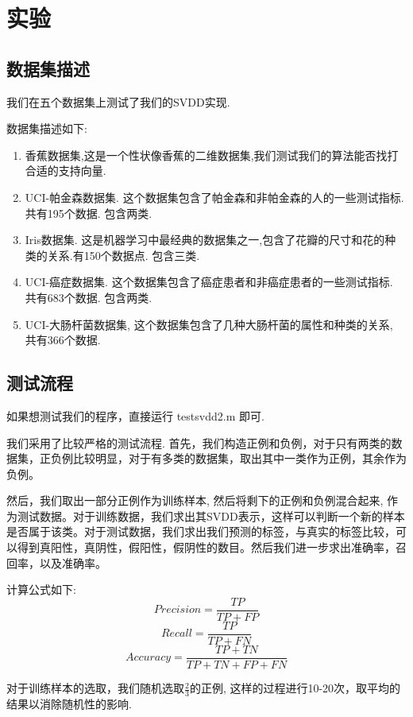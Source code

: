 \documentclass[article,12pt]{article}
\begin{document}
\section{实验}
\subsection{数据集描述}
我们在五个数据集上测试了我们的SVDD实现. 

数据集描述如下:

\begin{enumerate}
\item 香蕉数据集,这是一个性状像香蕉的二维数据集,我们测试我们的算法能否找打合适的支持向量.

\item UCI-帕金森数据集. 这个数据集包含了帕金森和非帕金森的人的一些测试指标. 共有195个数据. 包含两类. 

\item Iris数据集. 这是机器学习中最经典的数据集之一,包含了花瓣的尺寸和花的种类的关系.有150个数据点. 包含三类. 

\item UCI-癌症数据集. 这个数据集包含了癌症患者和非癌症患者的一些测试指标. 共有683个数据. 包含两类. 

\item UCI-大肠杆菌数据集, 这个数据集包含了几种大肠杆菌的属性和种类的关系, 共有366个数据. 


\end{enumerate}

\subsection{测试流程}

如果想测试我们的程序，直接运行 testsvdd2.m 即可.

我们采用了比较严格的测试流程. 首先，我们构造正例和负例，对于只有两类的数据集，正负例比较明显，对于有多类的数据集，取出其中一类作为正例，其余作为负例。

然后，我们取出一部分正例作为训练样本, 然后将剩下的正例和负例混合起来, 作为测试数据。对于训练数据，我们求出其SVDD表示，这样可以判断一个新的样本是否属于该类。对于测试数据，我们求出我们预测的标签，与真实的标签比较，可以得到真阳性，真阴性，假阳性，假阴性的数目。然后我们进一步求出准确率，召回率，以及准确率。

计算公式如下:
$$Precision = \frac{TP}{TP+FP}$$
$$Recall = \frac{TP}{TP+FN}$$
$$Accuracy = \frac{TP+TN}{TP+TN+FP+FN}$$

对于训练样本的选取，我们随机选取$\frac{2}{3}$的正例, 这样的过程进行10-20次，取平均的结果以消除随机性的影响.
\end{document}
